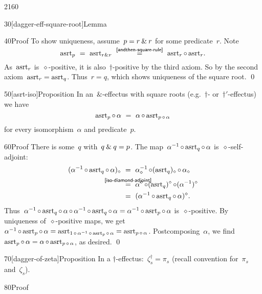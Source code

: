 \begin{parsec}{2160}
\begin{point}{30}[dagger-eff-square-root]{Lemma}
\begin{point}{40}{Proof}
To show uniqueness, assume~$p = r \mathbin{\&} r$ for some
    predicate~$r$.
Note
\begin{equation*}
    \asrt_p
        \ = \ \asrt_{\andthen{r}{r}}
        \ \overset{\smash{\sref{andthen-square-rule}}}{=} \ \asrt_r \after \asrt_r.
\end{equation*}
As~$\mathrm{asrt}_r$ is~$\diamond$-positive,
    it is also~$\dagger$-positive by the third axiom.
    So by the second axiom~$\mathrm{asrt}_r = \mathrm{asrt}_q$.
Thus~$r = q$, which shows uniqueness of the square root.
\qed
\end{point}
\end{point}
\begin{point}{50}[asrt-iso]{Proposition}%
In an~$\&$-effectus with square roots
    (e.g.~$\dagger$- or~$\dagger'$-effectus) we have
\begin{equation*}
    \mathrm{asrt}_p \mathop{\circ} \alpha
        \ =\  \alpha \mathop{\circ} \mathrm{asrt}_{p\mathop{\circ} \alpha}
\end{equation*}
for every isomorphism~$\alpha$ and predicate~$p$.
\begin{point}{60}{Proof}%
There is some~$q$ with~$q \mathbin{\&} q=p$.
The map~$\alpha^{-1} \mathop{\circ} \mathrm{asrt}_q \mathop{\circ} \alpha$
    is~$\diamond$-self-adjoint:
\begin{alignat*}{2}
    (\alpha^{-1} \after \asrt_q \after \alpha)_\diamond
    &\ = \ \alpha^{-1}_\diamond \after (\asrt_q)_\diamond \after \alpha_\diamond \\
    &\ \overset{\mathclap{\sref{iso-diamond-adjoint}}}{=} \ \alpha^\diamond \after (\asrt_q)^\diamond \after (\alpha^{-1})^\diamond\\
    &\ = \ (\alpha^{-1} \after \asrt_q \after \alpha)^\diamond.
\end{alignat*}
Thus~$
\alpha^{-1} \mathop{\circ} \mathrm{asrt}_q \mathop{\circ} \alpha \mathop{\circ}
\alpha^{-1} \mathop{\circ} \mathrm{asrt}_q \mathop{\circ} \alpha
= \alpha^{-1} \mathop{\circ} \mathrm{asrt}_p \mathop{\circ} \alpha
$ is~$\diamond$-positive.  By uniqueness of~$\diamond$-positive maps,
we get~$\alpha^{-1} \mathop{\circ} \mathrm{asrt}_p \mathop{\circ} \alpha
    = \mathrm{asrt}_{1 \mathop{\circ} \alpha^{-1}\mathop{\circ}\mathrm{asrt}_p \mathop{\circ} \alpha}
    = \mathrm{asrt}_{p \mathop{\circ} \alpha} $.
Postcomposing~$\alpha$, we find~$\mathrm{asrt}_p\mathop{\circ}\alpha = 
        \alpha \mathop{\circ} \mathrm{asrt}_{p \mathop{\circ} \alpha}$, as desired. \qed
\end{point}
\end{point}
\begin{point}{70}[dagger-of-zeta]{Proposition}%
In a $\dagger$-effectus:~$\zeta_s^\dagger = \pi_s$
(recall convention  for~$\pi_s$ and~$\zeta_s$).
\begin{point}{80}{Proof}%

\end{point}
\end{point}
\end{parsec}
